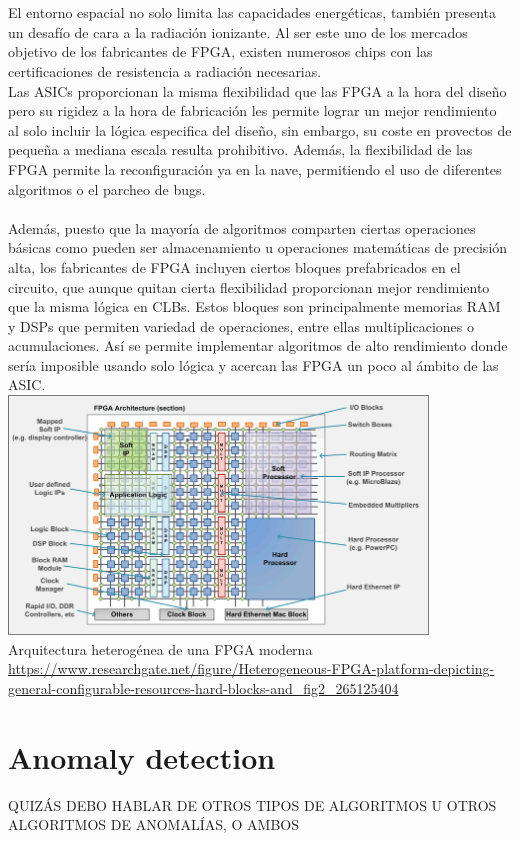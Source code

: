 \\
\\
El entorno espacial no solo limita las capacidades energéticas, también presenta un desafío de cara a la radiación ionizante. Al ser este uno de los mercados objetivo de los fabricantes de FPGA, existen numerosos chips con las certificaciones de resistencia a radiación necesarias.
\\
Las ASICs proporcionan la misma flexibilidad que las FPGA a la hora del diseño pero su rigidez a la hora de fabricación les permite lograr un mejor rendimiento al solo incluir la lógica especifica del diseño, sin embargo, su coste en provectos de pequeña a mediana escala resulta prohibitivo. Además, la flexibilidad de las FPGA permite la reconfiguración ya en la nave, permitiendo el uso de diferentes algoritmos o el parcheo de bugs.
\\
\\
Además, puesto que la mayoría de algoritmos comparten ciertas operaciones básicas como pueden ser almacenamiento u operaciones matemáticas de precisión alta, los fabricantes de FPGA incluyen ciertos bloques prefabricados en el circuito, que aunque quitan cierta flexibilidad proporcionan mejor rendimiento que la misma lógica en CLBs. Estos bloques son principalmente memorias RAM y DSPs que permiten variedad de operaciones, entre ellas multiplicaciones o acumulaciones. Así se permite implementar algoritmos de alto rendimiento donde sería imposible usando solo lógica y acercan las FPGA un poco al ámbito de las ASIC.
\\
\includegraphics[height=2.5in]{figures/FPGA_heterogenea.png}
\\
Arquitectura heterogénea de una FPGA moderna
\\
\url{https://www.researchgate.net/figure/Heterogeneous-FPGA-platform-depicting-general-configurable-resources-hard-blocks-and_fig2_265125404}


\section{Anomaly detection}
QUIZÁS DEBO HABLAR DE OTROS TIPOS DE ALGORITMOS U OTROS ALGORITMOS DE ANOMALÍAS, O AMBOS
\\
\\
\\

